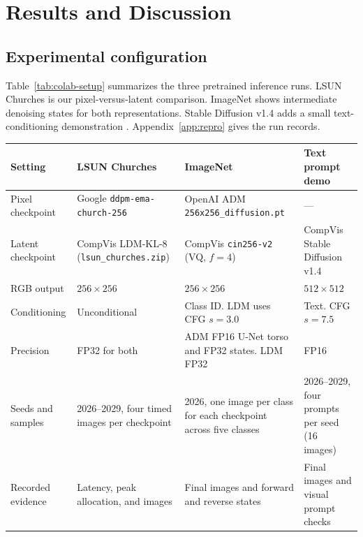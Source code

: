 {\section{Results and Discussion}\label{sec:results}

\subsection{Experimental configuration}\label{sec:colab-setup}
Table~\ref{tab:colab-setup} summarizes the three pretrained inference
runs. LSUN Churches is our pixel-versus-latent comparison. ImageNet
shows intermediate denoising states for both representations. Stable
Diffusion v1.4 adds a small text-conditioning demonstration
\cite{compvis2022sd14}. Appendix~\ref{app:repro} gives the run records.

\noindent\begin{minipage}{\textwidth}
\captionsetup{hypcap=false}
\centering\small
{}
\label{tab:colab-setup}
\begin{tabularx}{\textwidth}{@{}p{}YYY@{}}
\toprule
Setting & LSUN Churches & ImageNet & Text prompt demo\\
\midrule
Pixel checkpoint & Google \texttt{ddpm-ema-church-256} &
OpenAI ADM \texttt{256x256\_diffusion.pt} & ---\\
Latent checkpoint & CompVis LDM-KL-8 (\texttt{lsun\_churches.zip}) &
CompVis \texttt{cin256-v2} (VQ, $f=4$) & CompVis Stable Diffusion v1.4\\
RGB output & $256\times256$ & $256\times256$ & $512\times512$\\
Conditioning & Unconditional &
Class ID. LDM uses CFG $s=3.0$ & Text. CFG $s=7.5$\\
Precision & FP32 for both &
ADM FP16 U-Net torso and FP32 states. LDM FP32 & FP16\\
Seeds and samples & 2026--2029, four timed images per checkpoint &
2026, one image per class for each checkpoint across five classes &
2026--2029, four prompts per seed (16 images)\\
Recorded evidence & Latency, peak allocation, and images &
Final images and forward and reverse states &
Final images and visual prompt checks\\
\bottomrule
\end{tabularx}
\end{minipage}\par\medskip
}
